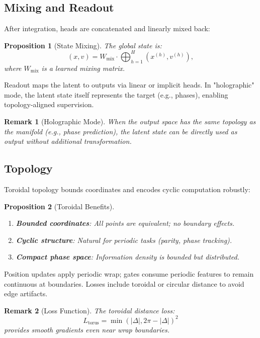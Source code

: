 \documentclass[12pt,letterpaper,twoside]{article}
\newtheorem{remarque}{Remark}[section]
\newtheorem{prop}{Proposition}[section]
\begin{document}
\subsection{Mixing and Readout}

After integration, heads are concatenated and linearly mixed back:

\begin{prop}[State Mixing]
The global state is:
\[
(x, v) = W_{\text{mix}} \cdot \bigoplus_{h=1}^{H} (x^{(h)}, v^{(h)}),
\]
where $W_{\text{mix}}$ is a learned mixing matrix.
\end{prop}

Readout maps the latent to outputs via linear or implicit heads. In "holographic" mode, the latent state itself represents the target (e.g., phases), enabling topology-aligned supervision.

\begin{remarque}[Holographic Mode]
When the output space has the same topology as the manifold (e.g., phase prediction), the latent state can be directly used as output without additional transformation.
\end{remarque}

\subsection{Topology}

Toroidal topology bounds coordinates and encodes cyclic computation robustly:

\begin{prop}[Toroidal Benefits]
\begin{enumerate}
\item \textbf{Bounded coordinates}: All points are equivalent; no boundary effects.
\item \textbf{Cyclic structure}: Natural for periodic tasks (parity, phase tracking).
\item \textbf{Compact phase space}: Information density is bounded but distributed.
\end{enumerate}
\end{prop}

Position updates apply periodic wrap; gates consume periodic features to remain continuous at boundaries. Losses include toroidal or circular distance to avoid edge artifacts.

\begin{remarque}[Loss Function]
The toroidal distance loss:
\[
L_{\text{torus}} = \min\left(|\Delta|, 2\pi - |\Delta|\right)^2
\]
provides smooth gradients even near wrap boundaries.
\end{remarque}
\end{document}
